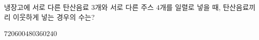 \hspace*{2mm}\begin{minipage}[t]{\dimexpr\linewidth-2mm\relax}\vspace{0pt}
냉장고에 서로 다른 탄산음료 $3$개와 서로 다른 주스 $4$개를 일렬로 넣을 때, 탄산음료끼리 이웃하게 넣는 경우의 수는?
\begin{choices32}{$720$}{$600$}{$480$}{$360$}{$240$}\end{choices32}\end{minipage}
